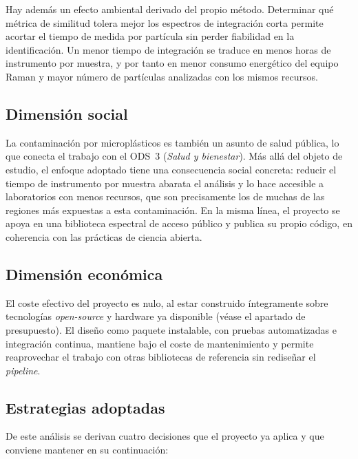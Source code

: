 Hay además un efecto ambiental derivado del propio método. Determinar qué métrica de similitud tolera mejor los espectros de integración corta permite acortar el tiempo de medida por partícula sin perder fiabilidad en la identificación. Un menor tiempo de integración se traduce en menos horas de instrumento por muestra, y por tanto en menor consumo energético del equipo Raman y mayor número de partículas analizadas con los mismos recursos.

\subsection*{Dimensión social}

La contaminación por microplásticos es también un asunto de salud pública, lo que conecta el trabajo con el ODS~3 (\emph{Salud y bienestar}). Más allá del objeto de estudio, el enfoque adoptado tiene una consecuencia social concreta: reducir el tiempo de instrumento por muestra abarata el análisis y lo hace accesible a laboratorios con menos recursos, que son precisamente los de muchas de las regiones más expuestas a esta contaminación. En la misma línea, el proyecto se apoya en una biblioteca espectral de acceso público y publica su propio código, en coherencia con las prácticas de ciencia abierta.

\subsection*{Dimensión económica}

El coste efectivo del proyecto es nulo, al estar construido íntegramente sobre tecnologías \textit{open-source} y hardware ya disponible (véase el apartado de presupuesto). El diseño como paquete instalable, con pruebas automatizadas e integración continua, mantiene bajo el coste de mantenimiento y permite reaprovechar el trabajo con otras bibliotecas de referencia sin rediseñar el \textit{pipeline}.

\subsection*{Estrategias adoptadas}

De este análisis se derivan cuatro decisiones que el proyecto ya aplica y que conviene mantener en su continuación:

